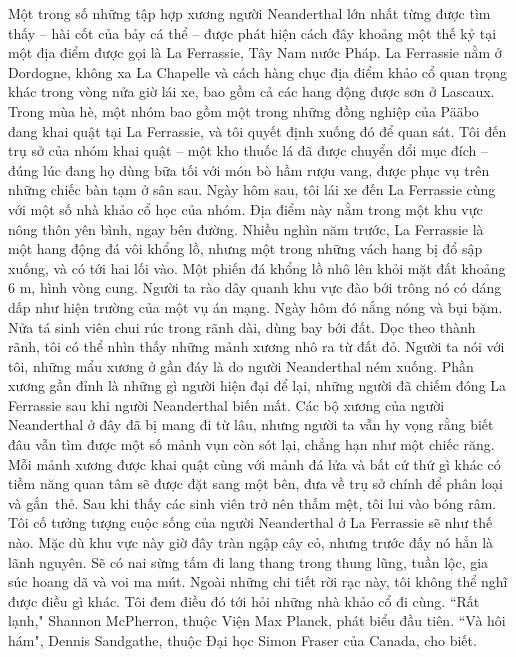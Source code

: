 \begin{multicols}{2}
	\vskip 0.1cm
	Một trong số những tập hợp xương người Neanderthal lớn nhất từng được tìm thấy -- hài cốt của bảy cá thể -- được phát hiện cách đây khoảng một thế kỷ tại một địa điểm được gọi là La Ferrassie, Tây Nam nước Pháp. La Ferrassie nằm ở Dordogne, không xa La Chapelle và cách hàng chục địa điểm khảo cổ quan trọng khác trong vòng nửa giờ lái xe, bao gồm cả các hang động được sơn ở Lascaux. Trong mùa hè, một nhóm bao gồm một trong những đồng nghiệp của Pääbo đang khai quật tại La Ferrassie, và tôi quyết định xuống đó để quan sát. Tôi đến trụ sở của nhóm khai quật -- một kho thuốc lá đã được chuyển đổi mục đích -- đúng lúc đang họ dùng bữa tối với món bò hầm rượu vang, được phục vụ trên những chiếc bàn tạm ở sân sau.
	\vskip 0.1cm
	Ngày hôm sau, tôi lái xe đến La Ferrassie cùng với một số nhà khảo cổ học của nhóm. Địa điểm này nằm trong một khu vực nông thôn yên bình, ngay bên đường. Nhiều nghìn năm trước, La Ferrassie là một hang động đá vôi khổng lồ, nhưng một trong những vách hang bị đổ sập xuống, và có tới hai lối vào. Một phiến đá khổng lồ nhô lên khỏi mặt đất khoảng $6$ m, hình vòng cung. Người ta rào dây quanh khu vực đào bới trông nó có dáng dấp như hiện trường của một vụ án mạng.
	\vskip 0.1cm
	Ngày hôm đó nắng nóng và bụi bặm. Nửa tá sinh viên chui rúc trong rãnh dài, dùng bay bới đất. Dọc theo thành rãnh, tôi có thể nhìn thấy những mảnh xương nhô ra từ đất đỏ. Người ta nói với tôi, những mẩu xương ở gần đáy là do người Neanderthal ném xuống. Phần xương gần đỉnh là những gì người hiện đại để lại, những người đã chiếm đóng La Ferrassie sau khi người Neanderthal biến mất. Các bộ xương của người Neanderthal ở đây đã bị mang đi từ lâu, nhưng người ta vẫn hy vọng rằng biết đâu vẫn tìm được một số mảnh vụn còn sót lại, chẳng hạn như một chiếc răng. Mỗi mảnh xương được khai quật cùng với mảnh đá lửa và bất cứ thứ gì khác có tiềm năng quan tâm sẽ được đặt sang một bên, đưa về trụ sở chính để phân loại và gắn~thẻ.
	\vskip 0.1cm
	Sau khi thấy các sinh viên trở nên thấm mệt, tôi lui vào bóng râm. Tôi cố tưởng tượng cuộc sống của người Neanderthal ở La Ferrassie sẽ như thế nào. Mặc dù khu vực này giờ đây tràn ngập cây cỏ, nhưng trước đấy nó hẳn là lãnh nguyên. Sẽ có nai sừng tấm đi lang thang trong thung lũng, tuần lộc, gia súc hoang dã và voi ma mút. Ngoài những chi tiết rời rạc này, tôi không thể nghĩ được điều gì khác. Tôi đem điều đó tới hỏi những nhà khảo cổ đi cùng.
	\vskip 0.1cm
	``Rất lạnh," Shannon McPherron, thuộc Viện Max Planck, phát biểu đầu tiên.
	\vskip 0.1cm
	``Và hôi hám", Dennis Sandgathe, thuộc Đại học Simon Fraser của Canada, cho biết.

\end{multicols}
